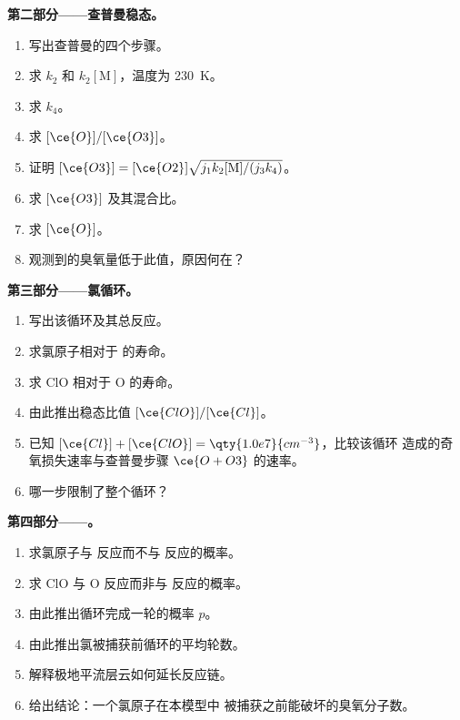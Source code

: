 \begin{problem}
\medskip\noindent\textbf{第二部分——查普曼稳态。}
\begin{enumerate}[resume]
  \item 写出查普曼的四个步骤。
  \item 求 $k_2$ 和 $k_2[\mathrm M]$，温度为 \qty{230}{K}。
  \item 求 $k_4$。
  \item 求 $[\ce{O}]/[\ce{O3}]$。
  \item 证明 $[\ce{O3}] = [\ce{O2}]\sqrt{j_1k_2[\mathrm M]/(j_3k_4)}$。
  \item 求 $[\ce{O3}]$ 及其混合比。
  \item 求 $[\ce{O}]$。
  \item 观测到的臭氧量低于此值，原因何在？
\end{enumerate}

\medskip\noindent\textbf{第三部分——氯循环。}
\begin{enumerate}[resume]
  \item 写出该循环及其总反应。
  \item 求氯原子相对于  的寿命。
  \item 求 ClO 相对于 O 的寿命。
  \item 由此推出稳态比值 $[\ce{ClO}]/[\ce{Cl}]$。
  \item 已知 $[\ce{Cl}] + [\ce{ClO}] = \qty{1.0e7}{cm^{-3}}$，比较该循环
        造成的奇氧损失速率与查普曼步骤 $\ce{O + O3}$ 的速率。
  \item 哪一步限制了整个循环？
\end{enumerate}

\medskip\noindent\textbf{第四部分——。}
\begin{enumerate}[resume]
  \item 求氯原子与  反应而不与
         反应的概率。
  \item 求 ClO 与 O 反应而非与  反应的概率。
  \item 由此推出循环完成一轮的概率 $p$。
  \item 由此推出氯被捕获前循环的平均轮数。
  \item 解释极地平流层云如何延长反应链。
  \item 给出结论：一个氯原子在本模型中
        被捕获之前能破坏的臭氧分子数。
\end{enumerate}
\end{problem}
